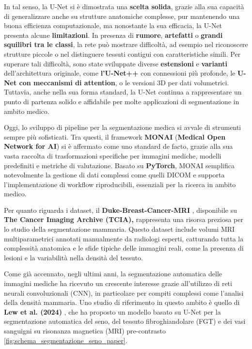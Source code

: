 In tal senso, la U-Net si è dimostrata una \textbf{scelta solida}, grazie alla sua capacità di generalizzare anche su strutture anatomiche complesse, pur mantenendo una buona efficienza computazionale, ma nonostante la sua efficacia, la U-Net presenta alcune \textbf{limitazioni}. In presenza di \textbf{rumore}, \textbf{artefatti} o \textbf{grandi squilibri tra le classi}, la rete può mostrare difficoltà, ad esempio nel riconoscere strutture piccole o nel distinguere tessuti contigui con caratteristiche simili. Per superare tali difficoltà, sono state sviluppate diverse \textbf{estensioni} e \textbf{varianti} dell’architettura originale, come \textbf{l’U-Net++} con connessioni più profonde, le \textbf{U-Net con meccanismi di attention}, o le versioni 3D per dati volumetrici. Tuttavia, anche nella sua forma standard, la U-Net continua a rappresentare un punto di partenza solido e affidabile per molte applicazioni di segmentazione in ambito medico.




Oggi, lo sviluppo di pipeline per la segmentazione medica si avvale di strumenti sempre più sofisticati. Tra questi, il framework \textbf{MONAI} (\textbf{Medical Open Network for AI}) si è affermato come uno standard de facto, grazie alla sua vasta raccolta di trasformazioni specifiche per immagini mediche, modelli predefiniti e metriche di valutazione. Basato su \textbf{PyTorch}, MONAI semplifica notevolmente la gestione di dati complessi come quelli DICOM e supporta l’implementazione di workflow riproducibili, essenziali per la ricerca in ambito medico.

Per quanto riguarda i dataset, il \textbf{Duke-Breast-Cancer-MRI} \cite{duke_breast_mri}, disponibile su \textbf{The Cancer Imaging Archive (TCIA),} rappresenta una risorsa preziosa per lo studio della segmentazione mammaria. Questo dataset include volumi MRI multiparametrici annotati manualmente da radiologi esperti, catturando tutta la complessità anatomica e le sfide tipiche delle immagini reali, come la presenza di lesioni e la variabilità nella densità del tessuto.


Come già accennato, negli ultimi anni, la segmentazione automatica delle immagini mediche ha ricevuto un crescente interesse grazie all’utilizzo di reti neurali convoluzionali (CNN), in particolare per compiti complessi come l’analisi della densità mammaria. Uno studio di riferimento in questo ambito è quello di \textbf{Lew et al. (2024)} \cite{lew2024segmentation}, che ha proposto un modello basato su U-Net per la segmentazione automatica del seno, del tessuto fibroghiandolare (FGT) e dei vasi sanguigni su risonanza magnetica (MRI) pre-contrasto \ref{fig:schema_segmentazione_seno_paper}.

